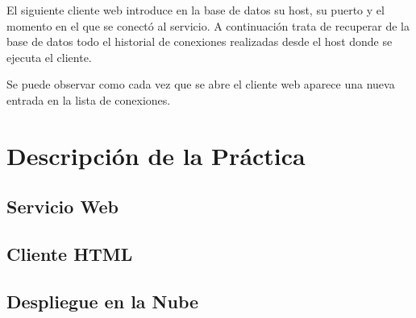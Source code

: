 \documentclass[12pt, a4paper, spanish]{scrartcl}
\begin{document}


El siguiente cliente web introduce en la base de datos su host, su puerto y el momento en el que se conectó al servicio. A continuación trata de recuperar de la base de datos todo el historial de conexiones realizadas desde el host donde se ejecuta el cliente.



Se puede observar como cada vez que se abre el cliente web aparece una nueva entrada en la lista de conexiones.

\section{Descripción de la Práctica}

\subsection{Servicio Web}

\subsection{Cliente HTML}

\subsection{Despliegue en la Nube}
\end{document}
